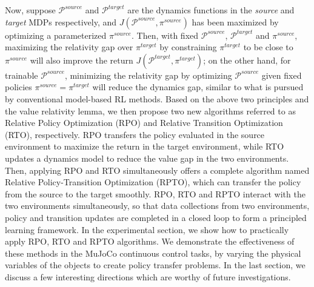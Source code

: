 \documentclass[letterpaper]{article} %
\def\P{{\mathcal{P}}}
\begin{document}
Now, suppose $\P^{source}$ and $\P^{target}$ are the dynamics functions in the \emph{source} and \emph{target} MDPs respectively, and $J(\P^{source},\pi^{source})$ has been maximized by optimizing a parameterized $\pi^{source}$. 
Then, with fixed $\P^{source}$, $\P^{target}$ and $\pi^{source}$, maximizing the relativity gap over $\pi^{target}$ by constraining $\pi^{target}$ to be close to $\pi^{source}$ will also improve the return $J(\P^{target},\pi^{target})$; on the other hand, for trainable $\P^{source}$, minimizing the relativity gap by optimizing $\P^{source}$ given fixed policies $\pi^{source}=\pi^{target}$ will reduce the dynamics gap, similar to what is pursued by conventional model-based RL methods. 
Based on the above two principles and the value relativity lemma, we then propose two new algorithms referred to as Relative Policy Optimization (RPO) and Relative Transition Optimization (RTO), respectively. RPO transfers the policy evaluated in the source environment to maximize the return in the target environment, while RTO updates a dynamics model to reduce the value gap in the two environments. Then, applying RPO and RTO simultaneously offers a complete algorithm named Relative Policy-Transition Optimization (RPTO), which can transfer the policy from the source to the target smoothly. RPO, RTO and RPTO interact with the two environments simultaneously, so that data collections from two environments, policy and transition updates are completed in a closed loop to form a principled learning framework. 
In the experimental section, we show how to practically apply RPO, RTO and RPTO algorithms. We demonstrate the effectiveness of these methods in the MuJoCo continuous control tasks, by varying the physical variables of the objects to create policy transfer problems. In the last section, we discuss a few interesting directions which are worthy of future investigations.
\end{document}

